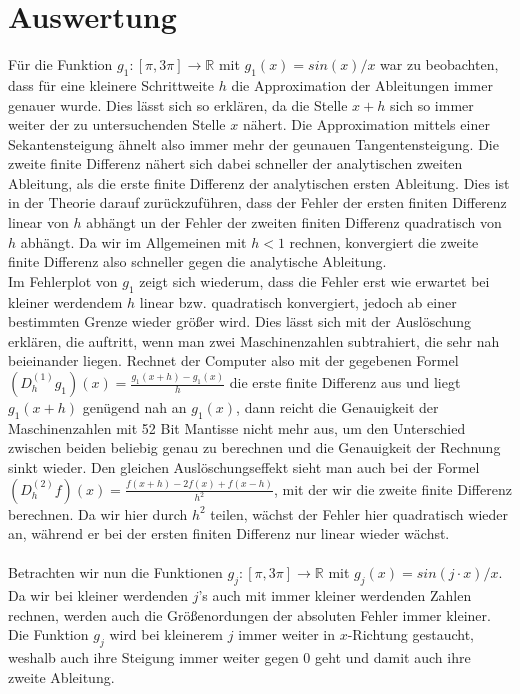 \documentclass{scrartcl}
\begin{document}
\pagebreak \section{Auswertung}
\label{sec:auswertung}
Für die Funktion $g_1:[\pi, 3\pi] \rightarrow \mathbb{R}$ mit $g_1(x)= sin(x)/x$ war zu beobachten, dass für eine kleinere Schrittweite $h$ die Approximation der Ableitungen immer genauer wurde.
Dies lässt sich so erklären, da die Stelle $x+h$ sich so immer weiter der zu untersuchenden Stelle $x$ nähert.
Die Approximation mittels einer Sekantensteigung ähnelt also immer mehr der geunauen Tangentensteigung.
Die zweite finite Differenz nähert sich dabei schneller der analytischen zweiten Ableitung, als die erste finite Differenz der analytischen ersten Ableitung.
Dies ist in der Theorie darauf zurückzuführen, dass der Fehler der ersten finiten Differenz linear von $h$ abhängt un der Fehler der zweiten finiten Differenz quadratisch von $h$ abhängt.
Da wir im Allgemeinen mit $h<1$ rechnen, konvergiert die zweite finite Differenz also schneller gegen die analytische Ableitung.\\
Im Fehlerplot von $g_1$ zeigt sich wiederum, dass die Fehler erst wie erwartet bei kleiner werdendem $h$ linear bzw. quadratisch konvergiert, jedoch ab einer bestimmten Grenze wieder größer wird.
Dies lässt sich mit der Auslöschung erklären, die auftritt, wenn man zwei Maschinenzahlen subtrahiert, die sehr nah beieinander liegen.
Rechnet der Computer also mit der gegebenen Formel $(D_h^{(1)}g_1)(x) = \frac{g_1(x+h)-g_1(x)}{h}$ die erste finite Differenz aus und liegt $g_1(x+h)$ genügend nah an $g_1(x)$, dann reicht die Genauigkeit der Maschinenzahlen mit 52 Bit Mantisse nicht mehr aus, um den Unterschied zwischen beiden beliebig genau zu berechnen und die Genauigkeit der Rechnung sinkt wieder.
Den gleichen Auslöschungseffekt sieht man auch bei der Formel $(D_h^{(2)}f)(x) = \frac{f(x+h)-2f(x)+f(x-h)}{h^2}$, mit der wir die zweite finite Differenz berechnen.
Da wir hier durch $h^2$ teilen, wächst der Fehler hier quadratisch wieder an, während er bei der ersten finiten Differenz nur linear wieder wächst.\\\\
Betrachten wir nun die Funktionen $g_j:[\pi, 3\pi] \rightarrow \mathbb{R}$ mit $g_j(x) = sin(j\cdot x)/x$.
Da wir bei kleiner werdenden $j$'s auch mit immer kleiner werdenden Zahlen rechnen, werden auch die Größenordungen der absoluten Fehler immer kleiner.
Die Funktion $g_j$ wird bei kleinerem $j$ immer weiter in $x$-Richtung gestaucht, weshalb auch ihre Steigung immer weiter gegen $0$ geht und damit auch ihre zweite Ableitung.
\end{document}
